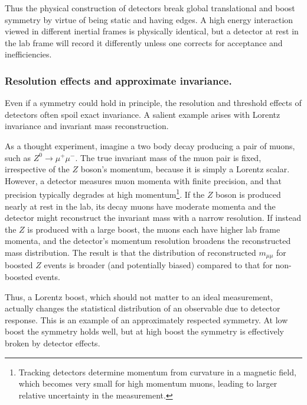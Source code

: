             Thus the physical construction of detectors break global translational and boost symmetry by virtue of being static and having edges.
            A high energy interaction viewed in different inertial frames is physically identical, but a detector at rest in the lab frame will record it differently unless one corrects for acceptance and inefficiencies.

        \subsubsection{Resolution effects and approximate invariance.}
            Even if a symmetry could hold in principle, the resolution and threshold effects of detectors often spoil exact invariance.
            A salient example arises with Lorentz invariance and invariant mass reconstruction.
            
            As a thought experiment, imagine a two body decay producing a pair of muons, such as $Z^0 \to \mu^+\mu^-$.
            The true invariant mass of the muon pair is fixed, irrespective of the $Z$ boson’s momentum, because it is simply a Lorentz scalar.
            However, a detector measures muon momenta with finite precision, and that precision typically degrades at high momentum\footnote{Tracking detectors determine momentum from curvature in a magnetic field, which becomes very small for high momentum muons, leading to larger relative uncertainty in the measurement.}.
            If the $Z$ boson is produced nearly at rest in the lab, its decay muons have moderate momenta and the detector might reconstruct the invariant mass with a narrow resolution.
            If instead the $Z$ is produced with a large boost, the muons each have higher lab frame momenta, and the detector's momentum resolution broadens the reconstructed mass distribution.
            The result is that the distribution of reconstructed $m_{\mu\mu}$ for boosted $Z$ events is broader (and potentially biased) compared to that for non-boosted events.
            
            Thus, a Lorentz boost, which should not matter to an ideal measurement, actually changes the statistical distribution of an observable due to detector response.
            This is an example of an approximately respected symmetry.
            At low boost the symmetry holds well, but at high boost the symmetry is effectively broken by detector effects.
            
